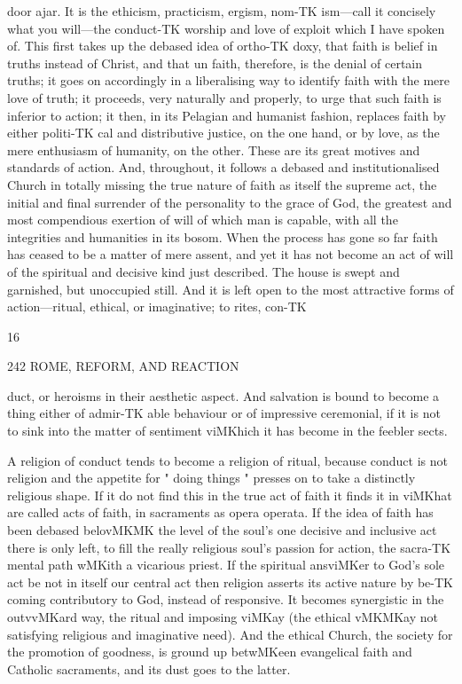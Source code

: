 \documentclass[12pt,a5paper,oneside]{book}
\begin{document}
{door ajar. It is the ethicism, practicism, ergism, nom-TK
ism---call it concisely what you will---the conduct-TK
worship and love of exploit which I have spoken 
of. This first takes up the debased idea of ortho-TK
doxy, that faith is belief in truths instead of Christ, 
and that un faith, therefore, is the denial of certain 
truths; it goes on accordingly in a liberalising way 
to identify faith with the mere love of truth; it 
proceeds, very naturally and properly, to urge that 
such faith is inferior to action; it then, in its Pelagian 
and humanist fashion, replaces faith by either politi-TK
cal and distributive justice, on the one hand, or by 
love, as the mere enthusiasm of humanity, on the 
other. These are its great motives and standards of 
action. And, throughout, it follows a debased and 
institutionalised Church in totally missing the true 
nature of faith as itself the supreme act, the initial 
and final surrender of the personality to the grace of 
God, the greatest and most compendious exertion of 
will of which man is capable, with all the integrities 
and humanities in its bosom. When the process has 
gone so far faith has ceased to be a matter of mere 
assent, and yet it has not become an act of will of 
the spiritual and decisive kind just described. The 
house is swept and garnished, but unoccupied still. 
And it is left open to the most attractive forms of 
action---ritual, ethical, or imaginative; to rites, con-TK

16 



242 ROME, REFORM, AND REACTION 

duct, or heroisms in their aesthetic aspect. And 
salvation is bound to become a thing either of admir-TK
able behaviour or of impressive ceremonial, if it is not 
to sink into the matter of sentiment viMKhich it has 
become in the feebler sects. 

A religion of conduct tends to become a religion of 
ritual, because conduct is not religion and the appetite 
for " doing things " presses on to take a distinctly 
religious shape. If it do not find this in the true act 
of faith it finds it in viMKhat are called acts of faith, in 
sacraments as opera operata. If the idea of faith has 
been debased belovMKMK the level of the soul's one 
decisive and inclusive act there is only left, to fill the 
really religious soul's passion for action, the sacra-TK
mental path wMKith a vicarious priest. If the spiritual 
ansviMKer to God's sole act be not in itself our central 
act then religion asserts its active nature by be-TK
coming contributory to God, instead of responsive. 
It becomes synergistic in the outvvMKard way, the ritual 
and imposing viMKay (the ethical vMKMKay not satisfying 
religious and imaginative need). And the ethical 
Church, the society for the promotion of goodness, 
is ground up betwMKeen evangelical faith and Catholic 
sacraments, and its dust goes to the latter. 



}
\end{document}
